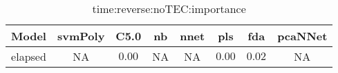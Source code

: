 \begin{table}[!ht]
	\centering
	\begin{tabular}{|c|c|c|c|c|c|c|c|}
		\hline
		Model & svmPoly & C5.0 & nb & nnet & pls & fda & pcaNNet \\ \hline
		elapsed & NA & $0.00$ & NA & NA & $0.00$ & $0.02$ & NA \\ \hline
	\end{tabular}
	\caption{time:reverse:noTEC:importance}
	\label{tab:time:reverse:noTEC:importance}
\end{table}
